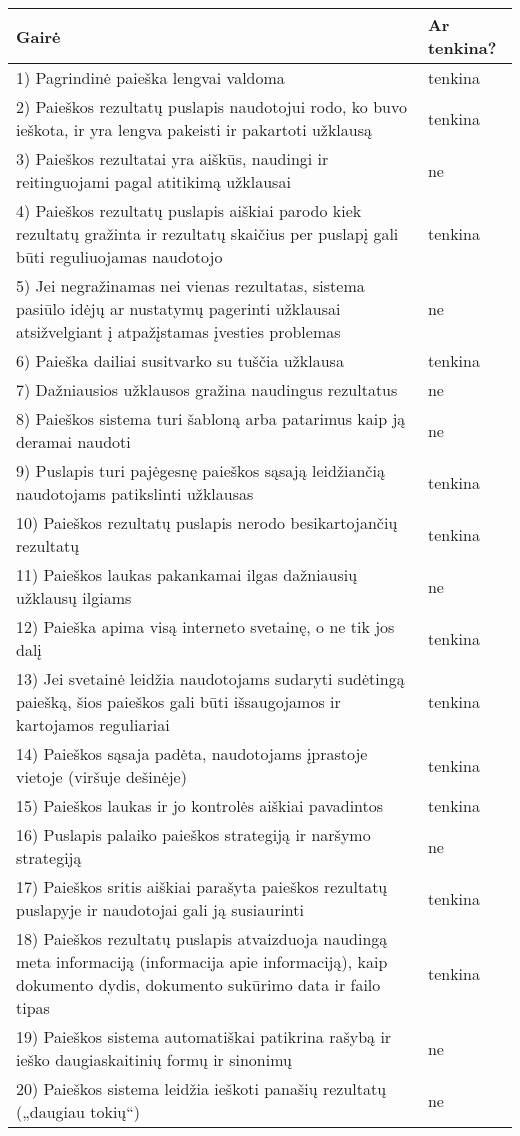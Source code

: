 \documentclass{VUMIFPSkursinis}
\begin{document}
\begin{center}
\begin{tabular}{ |p{}|p{2cm}| } 
 \hline
	Gairė & Ar tenkina? \\ \hline
	1) Pagrindinė paieška lengvai valdoma & tenkina \\ \hline
	2) Paieškos rezultatų puslapis naudotojui rodo, ko buvo ieškota, ir yra lengva pakeisti ir pakartoti užklausą & tenkina \\ \hline
	3) Paieškos rezultatai yra aiškūs, naudingi ir reitinguojami pagal atitikimą užklausai & ne \\ \hline
	4) Paieškos rezultatų puslapis aiškiai parodo kiek rezultatų gražinta ir rezultatų skaičius per puslapį gali būti reguliuojamas naudotojo & tenkina \\ \hline
	5) Jei negražinamas nei vienas rezultatas, sistema pasiūlo idėjų ar nustatymų pagerinti užklausai atsižvelgiant į atpažįstamas įvesties problemas & ne \\ \hline
	6) Paieška dailiai susitvarko su tuščia užklausa & tenkina \\ \hline
	7) Dažniausios užklausos gražina naudingus rezultatus & ne \\ \hline
	8) Paieškos sistema turi šabloną arba patarimus kaip ją deramai naudoti & ne \\ \hline
	9) Puslapis turi pajėgesnę paieškos sąsają leidžiančią naudotojams patikslinti užklausas & tenkina \\ \hline
	10) Paieškos rezultatų puslapis nerodo besikartojančių rezultatų & tenkina \\ \hline
	11) Paieškos laukas pakankamai ilgas dažniausių užklausų ilgiams & ne \\ \hline
	12) Paieška apima visą interneto svetainę, o ne tik jos dalį & tenkina \\ \hline
	13) Jei svetainė leidžia naudotojams sudaryti sudėtingą paiešką, šios paieškos gali būti išsaugojamos ir kartojamos reguliariai & tenkina \\ \hline
	14) Paieškos sąsaja padėta, naudotojams įprastoje vietoje (viršuje dešinėje) & tenkina \\ \hline
	15) Paieškos laukas ir jo kontrolės aiškiai pavadintos & tenkina \\ \hline
	16) Puslapis palaiko paieškos strategiją ir naršymo strategiją & ne \\ \hline
	17) Paieškos sritis aiškiai parašyta paieškos rezultatų puslapyje ir naudotojai gali ją susiaurinti & tenkina \\ \hline
	18) Paieškos rezultatų puslapis atvaizduoja naudingą meta informaciją (informacija apie informaciją), kaip dokumento dydis, dokumento sukūrimo data ir failo tipas & tenkina \\ \hline
	19) Paieškos sistema automatiškai patikrina rašybą ir ieško daugiaskaitinių formų ir sinonimų & ne \\ \hline
	20) Paieškos sistema leidžia ieškoti panašių rezultatų („daugiau tokių“) & ne \\ \hline
\end{tabular}
\label{PaieškosLentelėPrad}
\end{center}
\end{document}
